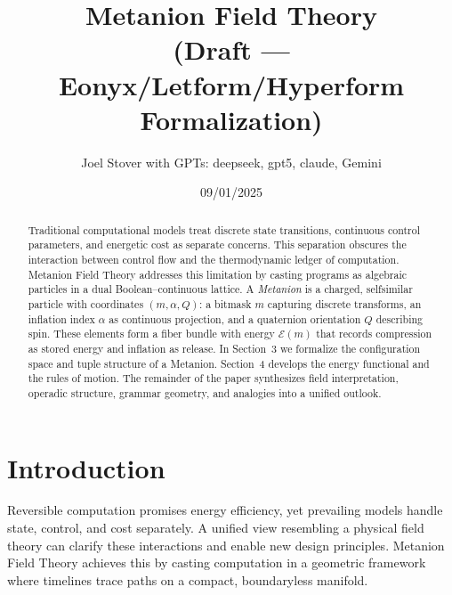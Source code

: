 \documentclass{article}
\title{Metanion Field Theory\\(Draft --- Eonyx/Letform/Hyperform Formalization)}
\author{Joel Stover with GPTs: deepseek, gpt5, claude, Gemini}
\date{09/01/2025}
\begin{document}
\maketitle

\begin{abstract}
Traditional computational models treat discrete state transitions, continuous control parameters, and energetic cost as separate concerns. This separation obscures the interaction between control flow and the thermodynamic ledger of computation. Metanion Field Theory addresses this limitation by casting programs as algebraic particles in a dual Boolean--continuous lattice. A \emph{Metanion} is a charged, self\textendash similar particle with coordinates $(m, \alpha, Q)$: a bitmask $m$ capturing discrete transforms, an inflation index $\alpha$ as continuous projection, and a quaternion orientation $Q$ describing spin. These elements form a fiber bundle with energy $\mathcal{E}(m)$ that records compression as stored energy and inflation as release. In Section~3 we formalize the configuration space and tuple structure of a Metanion. Section~4 develops the energy functional and the rules of motion. The remainder of the paper synthesizes field interpretation, operadic structure, grammar geometry, and analogies into a unified outlook.
\end{abstract}

\section{Introduction}
Reversible computation promises energy efficiency, yet prevailing models handle state, control, and cost separately. A unified view resembling a physical field theory can clarify these interactions and enable new design principles. Metanion Field Theory achieves this by casting computation in a geometric framework where timelines trace paths on a compact, boundaryless manifold.
\end{document}
